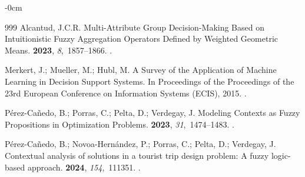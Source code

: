 \documentclass[mathematics,article,submit,moreauthors]{Definitions/mdpi}
\begin{document}
\begin{adjustwidth}{-\extralength}{0cm}
\begin{thebibliography}{999}
Alcantud, J.C.R.
\newblock Multi-Attribute Group Decision-Making Based on Intuitionistic Fuzzy Aggregation Operators Defined by Weighted Geometric Means.
 {\bf 2023}, {\em 8},~1857--1866.
.

Merkert, J.; Mueller, M.; Hubl, M.
\newblock A Survey of the Application of Machine Learning in Decision Support Systems.
\newblock In Proceedings of the Proceedings of the 23rd European Conference on Information Systems (ECIS),  2015.
.

Pérez-Cañedo, B.; Porras, C.; Pelta, D.; Verdegay, J.
\newblock Modeling Contexts as Fuzzy Propositions in Optimization Problems.
 {\bf 2023}, {\em 31},~1474--1483.
.

P{\'e}rez-Ca{\~n}edo, B.; Novoa-Hern{\'a}ndez, P.; Porras, C.; Pelta, D.; Verdegay, J.
\newblock Contextual analysis of solutions in a tourist trip design problem: A fuzzy logic-based approach.
 {\bf 2024}, {\em 154},~111351.
.

\end{thebibliography}
\end{adjustwidth}
\PublishersNote{}
\end{document}
